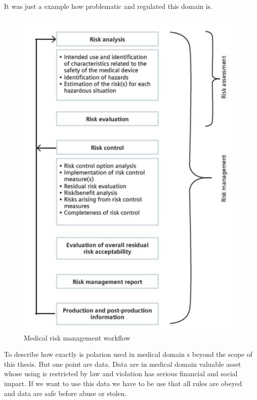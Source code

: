 \documentclass[thesis=M,english]{FITthesis}[2012/06/26]
\begin{document}
It was just a example how problematic and regulated this domain is.\\

\begin{figure}[h!]\centering
	\includegraphics[width=1\textwidth]{pictures/medical_standard}
	\caption{Medical risk management workflow \cite{polarion_alm}}\label{fig:medical_standard}
\end{figure}

To describe how exactly is \acrshort{polarion} used in medical domain s beyond the scope of this thesis. But one point are data. Data are in medical domain valuable asset whose using is restricted by law and violation has serious financial and social impart. If we want to use this data we have to be use that all rules are obeyed and data are safe before abuse or stolen.
\end{document}
